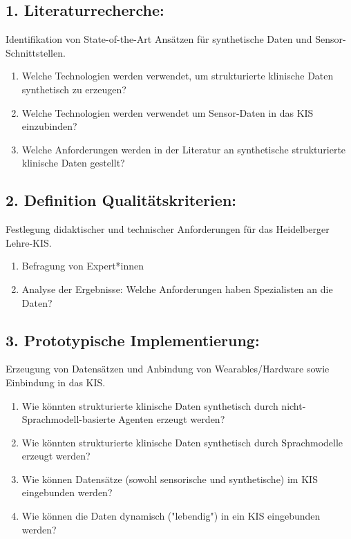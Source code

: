 \subsection{1. Literaturrecherche:} Identifikation von State-of-the-Art Ansätzen für synthetische Daten und Sensor-Schnittstellen.
\begin{enumerate}[label=1.\arabic*]
    \item Welche Technologien werden verwendet, um strukturierte klinische Daten synthetisch zu erzeugen?
    \item Welche Technologien werden verwendet um Sensor-Daten in das KIS einzubinden?
    \item Welche Anforderungen werden in der Literatur an synthetische strukturierte klinische Daten gestellt?
\end{enumerate}

\subsection{2. Definition Qualitätskriterien:} Festlegung didaktischer und technischer Anforderungen für das Heidelberger Lehre-KIS.
\begin{enumerate}[label=2.\arabic*]
    \item Befragung von Expert*innen
    \item Analyse der Ergebnisse: Welche Anforderungen haben Spezialisten an die Daten?
\end{enumerate}

\subsection{3. Prototypische Implementierung:} Erzeugung von Datensätzen und Anbindung von Wearables/Hardware sowie Einbindung in das KIS.
\begin{enumerate}[label=3.\arabic*]
    \item Wie könnten strukturierte klinische Daten synthetisch durch nicht-Sprachmodell-basierte Agenten erzeugt werden?
    \item Wie könnten strukturierte klinische Daten synthetisch durch Sprachmodelle erzeugt werden?
    \item Wie können Datensätze (sowohl sensorische und synthetische) im KIS eingebunden werden?
    \item Wie können die Daten dynamisch ("lebendig") in ein KIS eingebunden werden?
\end{enumerate}

